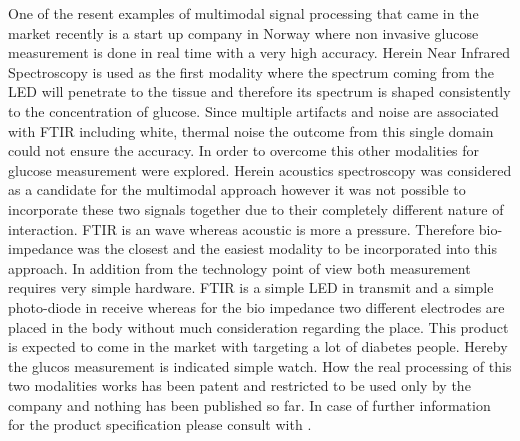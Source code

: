 One of the resent examples of multimodal signal processing that came in the market recently is a start up company in Norway where non invasive glucose measurement is done in real time with a very high accuracy. Herein Near Infrared Spectroscopy is used as the first modality where the spectrum coming from the LED will penetrate to the tissue and therefore its spectrum is shaped consistently to the concentration of glucose. Since multiple artifacts and noise are associated with FTIR including white, thermal noise the outcome from this single domain could not ensure the accuracy. In order to overcome this other modalities for glucose measurement were explored. Herein acoustics spectroscopy was considered as a candidate for the multimodal approach however it was not possible to incorporate these two signals together due to their completely different nature of interaction. FTIR is an wave whereas acoustic is more a pressure. Therefore bio-impedance was the closest and the easiest modality to be incorporated into this approach. In addition from the technology point of view both measurement requires very simple hardware. FTIR is a simple LED in transmit and a simple photo-diode in receive whereas for the bio impedance two different electrodes are placed in the body without much consideration regarding the place. This product is expected to come in the market with targeting a lot of diabetes people. Hereby the glucos measurement is indicated simple watch. How the real processing of this two modalities works has been patent and restricted to be used only by the company and nothing has been published so far. In case of further information for the product specification please consult with \cite{20}. 

